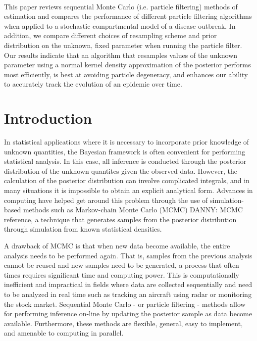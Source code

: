 \documentclass{elsarticle}
\newcommand{\danny}[1]{{\color{blue}DANNY: #1}}
\begin{document}
 \\

This paper reviews sequential Monte Carlo (i.e. particle filtering) methods of estimation and compares the performance of different particle filtering algorithms when applied to a stochastic compartmental model of a disease outbreak.  In addition, we compare different choices of resampling scheme and prior distribution on the unknown, fixed parameter when running the particle filter.  Our results indicate that an algorithm that resamples values of the unknown parameter using a normal kernel density approximation of the posterior performs most efficiently, is best at avoiding particle degeneracy, and enhances our ability to accurately track the evolution of an epidemic over time.

\section{Introduction} \label{sec:intro}

In statistical applications where it is necessary to incorporate prior knowledge of unknown quantities, the Bayesian framework is often convenient for performing statistical analysis.  In this case, all inference is conducted through the posterior distribution of the unknown quantites given the observed data.  However, the calculation of the posterior distribution can involve complicated integrals, and in many situations it is impossible to obtain an explicit analytical form.  Advances in computing have helped get around this problem through the use of simulation-based methods such as Markov-chain Monte Carlo (MCMC) \danny{MCMC reference}, a technique that generates samples from the posterior distribution through simulation from known statistical densities.

A drawback of MCMC is that when new data become available, the entire analysis needs to be performed again.  That is, samples from the previous analysis cannot be reused and new samples need to be generated, a process that often times requires significant time and computing power.  This is computationally inefficient and impractical in fields where data are collected sequentially and need to be analyzed in real time such as tracking an aircraft using radar or monitoring the stock market.  Sequential Monte Carlo - or particle filtering - methods allow for performing inference on-line by updating the posterior sample as data become available.  Furthermore, these methods are flexible, general, easy to implement, and amenable to computing in parallel.
\end{document}
